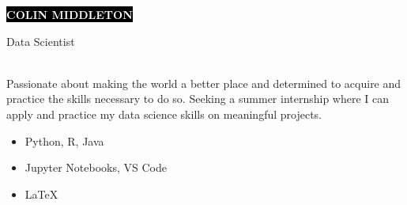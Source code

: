 \documentclass[11pt]{developercv} %
\begin{document}
\colorbox{black}{{\HUGE\textcolor{white}{\textbf{\MakeUppercase{Colin Middleton}}}}}

\vspace{6pt}

{\huge Data Scientist} %

\vspace{6pt}

\hspace{8pt}
\hspace{8pt}

\vspace{0.5cm}

\begin{minipage}[t]{0.5\textwidth} %
	 \\
	Passionate about making the world a better place and determined to acquire and practice the skills necessary to do so. Seeking a summer internship where I can apply and practice my data science skills on meaningful projects. 
\end{minipage}
\hfill %
\begin{minipage}[t]{0.4\textwidth}
	\begin{itemize}
		\item Python, R, Java
		\item Jupyter Notebooks, VS Code
	   	\item LaTeX
	\end{itemize}
\end{minipage}

\vspace{0.5cm}


\end{document}
